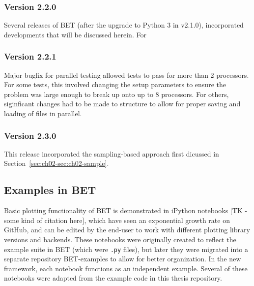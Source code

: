 \subsubsection{Version 2.2.0}
Several releases of BET (after the upgrade to Python 3 in v2.1.0), incorporated developments that will be discussed herein.
For


\subsubsection{Version 2.2.1}
Major bugfix for parallel testing allowed tests to pass for more than 2 processors.
For some tests, this involved changing the setup parameters to ensure the problem was large enough to break up onto up to 8 processors.
For others, siginficant changes had to be made to structure to allow for proper saving and loading of files in parallel.


\subsubsection{Version 2.3.0}
This release incorporated the sampling-based approach first dicussed in Section~\ref{sec:ch02-sec:ch02-sample}.


\subsection{Examples in BET}
Basic plotting functionality of BET is demonstrated in iPython notebooks [TK - some kind of citation here], which have seen an exponential growth rate on GitHub, and can be edited by the end-user to work with different plotting library versions and backends.
These notebooks were originally created to reflect the example suite in BET (which were {\tt .py} files), but later they were migrated into a separate repository BET-examples to allow for better organization.
In the new framework, each notebook functions as an independent example.
Several of these notebooks were adapted from the example code in this thesis repository.

